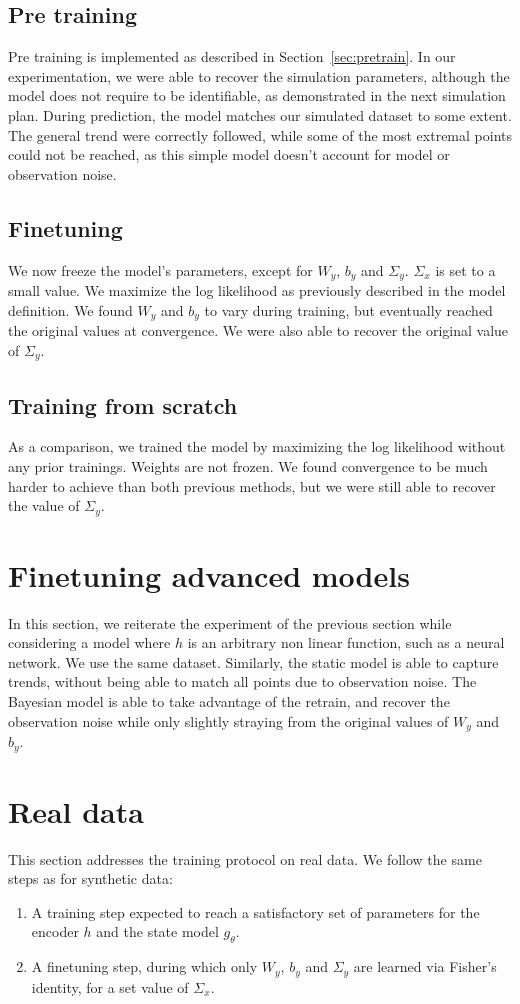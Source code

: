 \documentclass[10pt,a4paper]{report}
\begin{document}
\subsection{Pre training}
Pre training is implemented as described in Section~\ref{sec:pretrain}.
In our experimentation, we were able to recover the simulation parameters, although the model does not require to be identifiable, as demonstrated in the next simulation plan.
During prediction, the model matches our simulated dataset to some extent.
The general trend were correctly followed, while some of the most extremal points could not be reached, as this simple model doesn't account for model or observation noise.

\subsection{Finetuning}
We now freeze the model's parameters, except for $W_y$, $b_y$ and $\Sigma_y$.
$\Sigma_x$ is set to a small value.
We maximize the log likelihood as previously described in the model definition.
We found $W_y$ and $b_y$ to vary during training, but eventually reached the original values at convergence.
We were also able to recover the original value of $\Sigma_y$.

\subsection{Training from scratch}
As a comparison, we trained the model by maximizing the log likelihood without any prior trainings.
Weights are not frozen.
We found convergence to be much harder to achieve than both previous methods, but we were still able to recover the value of $\Sigma_y$.

\section{Finetuning advanced models}
In this section, we reiterate the experiment of the previous section while considering a model where $h$ is an arbitrary non linear function, such as a neural network.
We use the same dataset.
Similarly, the static model is able to capture trends, without being able to match all points due to observation noise.
The Bayesian model is able to take advantage of the retrain, and recover the observation noise while only slightly straying from the original values of $W_y$ and $b_y$.

\section{Real data}
This section addresses the training protocol on real data.
We follow the same steps as for synthetic data:

\begin{enumerate}
        \item A training step expected to reach a satisfactory set of parameters for the encoder $h$ and the state model $g_\theta$.
        \item A finetuning step, during which only $W_y$, $b_y$ and $\Sigma_y$ are learned via Fisher's identity, for a set value of $\Sigma_x$.
\end{enumerate}
\end{document}
